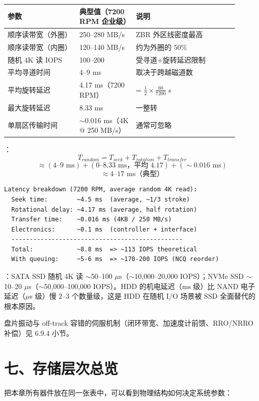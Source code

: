 \begin{longtable}{L{0.28\linewidth}L{0.22\linewidth}L{0.4\linewidth}}
\toprule
参数 & 典型值（7200 RPM 企业级） & 说明 \\
\midrule
顺序读带宽（外圈） & 250--280 MB/s & ZBR 外区线密度最高 \\
顺序读带宽（内圈） & 120--140 MB/s & 约为外圈的 50\% \\
随机 4K 读 IOPS & 100--200 & 受寻道+旋转延迟限制 \\
平均寻道时间 & 4--9 ms & 取决于跨越磁道数 \\
平均旋转延迟 & 4.17 ms（7200 RPM） & = $\frac{1}{2} \times \frac{60}{7200}$ s \\
最大旋转延迟 & 8.33 ms & 一整转 \\
单扇区传输时间 & $\sim$0.016 ms（4K @ 250 MB/s） & 通常可忽略 \\
\bottomrule
\end{longtable}

：
\[
T_{random} = T_{seek} + T_{rotation} + T_{transfer}
\]
\[
\approx (4\text{--}9 \text{ ms}) + (0\text{--}8.33 \text{ ms，平均 4.17}) + (\sim0.016 \text{ ms})
\]
\[
\approx 4\text{--}17 \text{ ms（典型）}
\]

\begin{lstlisting}
Latency breakdown (7200 RPM, average random 4K read):
  Seek time:        ~4.5 ms  (average, ~1/3 stroke)
  Rotational delay: ~4.17 ms (average, half rotation)
  Transfer time:    ~0.016 ms (4KB / 250 MB/s)
  Electronics:      ~0.1 ms  (controller + interface)
  -----------------------------------------------
  Total:            ~8.8 ms  => ~113 IOPS theoretical
  With queuing:     ~5-6 ms  => ~170-200 IOPS (NCQ reorder)
\end{lstlisting}

：SATA SSD 随机 4K 读 $\sim$50--100 $\mu$s（$\sim$10,000--20,000 IOPS）；NVMe SSD $\sim$10--20 $\mu$s（$\sim$50,000--100,000 IOPS）。HDD 的机电延迟（ms 级）比 NAND 电子延迟（$\mu$s 级）慢 2--3 个数量级，这是 HDD 在随机 I/O 场景被 SSD 全面替代的根本原因。

盘片振动与 off-track 容错的伺服机制（闭环带宽、加速度计前馈、RRO/NRRO 补偿）见 6.9.4 小节。

\section{七、存储层次总览}

把本章所有器件放在同一张表中，可以看到物理结构如何决定系统参数：

